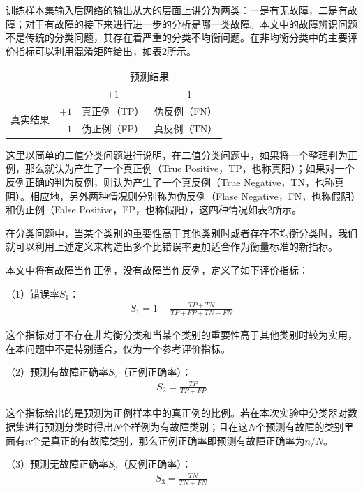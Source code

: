 \documentclass{ctacn}%
\begin{document}
\begin{multicols}{2}
训练样本集输入后网络的输出从大的层面上讲分为两类：一是有无故障，二是有故障；对于有故障的接下来进行进一步的分析是哪一类故障。本文中的故障辨识问题不是传统的分类问题，其存在着严重的分类不均衡问题。在非均衡分类中的主要评价指标可以利用混淆矩阵给出，如表2所示。


\begin{center}
	\label{tab:2}
	\begin{tabular} {cccc}\toprule
		\multirow{2}{*}[-2pt]{}&\multirow{2}{*}[-2pt]{}&\multicolumn{2}{c}{预测结果}\\
		\cmidrule(lr){3-4}
		&&$+1$&$-1$\\\hline
		\multirow{2}{*}[-2pt]{真实结果}&$+1$&真正例（TP）&伪反例（FN）\\
		&$-1$&伪正例（FP）&真反例（TN）\\
		\bottomrule
\end{tabular}\end{center}

这里以简单的二值分类问题进行说明，在二值分类问题中，如果将一个整理判为正例，那么就认为产生了一个真正例（True Positive，TP，也称真阳）；如果对一个反例正确的判为反例，则认为产生了一个真反例（True Negative，TN，也称真阴）。相应地，另外两种情况则分别称为伪反例（Flase Negative，FN，也称假阴）和伪正例（False Positive，FP，也称假阳），这四种情况如表2所示。

在分类问题中，当某个类别的重要性高于其他类别时或者存在不均衡分类时，我们就可以利用上述定义来构造出多个比错误率更加适合作为衡量标准的新指标。

本文中将有故障当作正例，没有故障当作反例，定义了如下评价指标：

（1）错误率$S_1$：
\begin{align}
S_1=1-\frac{TP+TN}{TP+FP+TN+FN}
\end{align}

这个指标对于不存在非均衡分类和当某个类别的重要性高于其他类别时较为实用，在本问题中不是特别适合，仅为一个参考评价指标。

（2）预测有故障正确率$S_2$（正例正确率）：
\begin{align}
S_2=\frac{TP}{TP+FP}
\end{align}

这个指标给出的是预测为正例样本中的真正例的比例。若在本次实验中分类器对数据集进行预测分类时得出$N$个样例为有故障类别；且在这$N$个预测有故障的类别里面有$n$个是真正的有故障类别，那么正例正确率即预测有故障正确率为$n/N$。

（3）预测无故障正确率$S_3$（反例正确率）：
\begin{align}
S_3=\frac{TN}{TN+FN}
\end{align}


\end{multicols}
\end{document}
